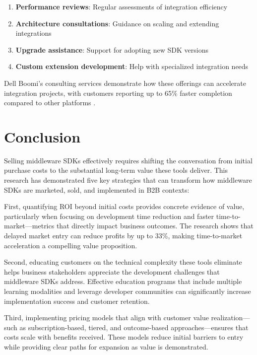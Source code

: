 \documentclass[11pt,a4paper]{article}
\begin{document}
\begin{enumerate}
    \item \textbf{Performance reviews}: Regular assessments of integration efficiency
    \item \textbf{Architecture consultations}: Guidance on scaling and extending integrations
    \item \textbf{Upgrade assistance}: Support for adopting new SDK versions
    \item \textbf{Custom extension development}: Help with specialized integration needs
\end{enumerate}

Dell Boomi's consulting services demonstrate how these offerings can accelerate integration projects, with customers reporting up to 65\% faster completion compared to other platforms \cite{multishoring2023}.

\section{Conclusion}

Selling middleware SDKs effectively requires shifting the conversation from initial purchase costs to the substantial long-term value these tools deliver. This research has demonstrated five key strategies that can transform how middleware SDKs are marketed, sold, and implemented in B2B contexts:

First, quantifying ROI beyond initial costs provides concrete evidence of value, particularly when focusing on development time reduction and faster time-to-market—metrics that directly impact business outcomes. The research shows that delayed market entry can reduce profits by up to 33\%, making time-to-market acceleration a compelling value proposition.

Second, educating customers on the technical complexity these tools eliminate helps business stakeholders appreciate the development challenges that middleware SDKs address. Effective education programs that include multiple learning modalities and leverage developer communities can significantly increase implementation success and customer retention.

Third, implementing pricing models that align with customer value realization—such as subscription-based, tiered, and outcome-based approaches—ensures that costs scale with benefits received. These models reduce initial barriers to entry while providing clear paths for expansion as value is demonstrated.
\end{document}
